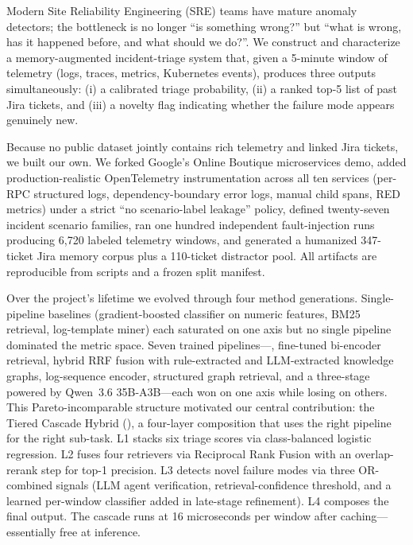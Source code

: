 Modern Site Reliability Engineering (SRE) teams have mature anomaly detectors; the bottleneck is no longer ``is something wrong?'' but ``what is wrong, has it happened before, and what should we do?''. We construct and characterize a memory-augmented incident-triage system that, given a 5-minute window of telemetry (logs, traces, metrics, Kubernetes events), produces three outputs simultaneously: (i) a calibrated triage probability, (ii) a ranked top-5 list of past Jira tickets, and (iii) a novelty flag indicating whether the failure mode appears genuinely new.

Because no public dataset jointly contains rich telemetry and linked Jira tickets, we built our own. We forked Google's Online Boutique microservices demo, added production-realistic OpenTelemetry instrumentation across all ten services (per-RPC structured logs, dependency-boundary error logs, manual child spans, RED metrics) under a strict ``no scenario-label leakage'' policy, defined twenty-seven incident scenario families, ran one hundred independent fault-injection runs producing 6{,}720 labeled telemetry windows, and generated a humanized 347-ticket Jira memory corpus plus a 110-ticket distractor pool. All artifacts are reproducible from scripts and a frozen split manifest.

Over the project's lifetime we evolved through four method generations. Single-pipeline baselines (gradient-boosted classifier on numeric features, BM25 retrieval, log-template miner) each saturated on one axis but no single pipeline dominated the metric space. Seven trained pipelines---\hgb, fine-tuned bi-encoder retrieval, hybrid RRF fusion with rule-extracted and LLM-extracted knowledge graphs, log-sequence encoder, structured graph retrieval, and a three-stage \agent{} powered by Qwen~3.6 35B-A3B---each won on one axis while losing on others. This Pareto-incomparable structure motivated our central contribution: the Tiered Cascade Hybrid (\tch{}), a four-layer composition that uses the right pipeline for the right sub-task. L1 stacks six triage scores via class-balanced logistic regression. L2 fuses four retrievers via Reciprocal Rank Fusion with an overlap-rerank step for top-1 precision. L3 detects novel failure modes via three OR-combined signals (LLM agent verification, retrieval-confidence threshold, and a learned per-window classifier added in late-stage refinement). L4 composes the final output. The cascade runs at 16 microseconds per window after caching---essentially free at inference.

